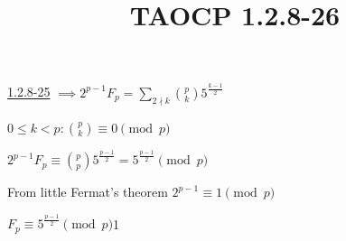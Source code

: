 \documentclass{article}
\title{TAOCP 1.2.8\mbox{-}26}
\begin{document}
\maketitle

\href{./1.2.8-25.pdf}{1.2.8\mbox{-}25} \( \implies 2^{p-1}F_{p} = \sum_{2 \nmid k} \binom{p}{k}5^{\frac{k-1}{2}} \)

\( 0 \leq k < p: \binom{p}{k} \equiv 0 \pmod p \)

\( 2^{p-1}F_{p} \equiv \binom{p}{p}5^{\frac{p-1}{2}} = 5^{\frac{p-1}{2}} \pmod p \)

From little Fermat's theorem \( 2^{p-1} \equiv 1 \pmod p \)

\( F_{p} \equiv 5^{\frac{p-1}{2}} \pmod p \)1
\end{document}
